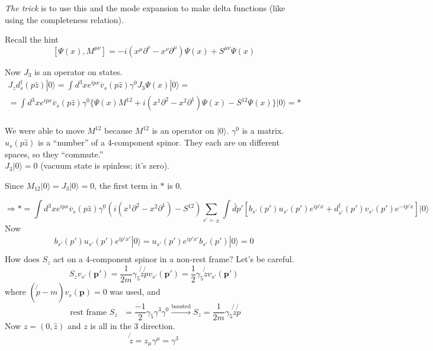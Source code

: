 \documentclass[twoside]{amsart}
\begin{document}
\emph{The trick} is to use this and the mode expansion to make delta functions (like using the completeness relation).  

Recall the hint 
\[
[ \Psi(x), M^{\mu \nu} ] = -i (x^{\mu} \partial^{\nu} - x^{\nu} \partial^{\mu})\Psi(x) + S^{\mu \nu} \Psi(x)
\]

Now $J_3$ is an operator on states.  
\[
\begin{gathered}
  J_z d_s^{\dag}(p\hat{z})|0\rangle = \int d^3x e^{ipx} \overline{v}_s(p\hat{z}) \gamma^0 J_3 \Psi(x)| 0\rangle = \\
  = \int d^3x e^{ipx} \overline{v}_s(p\hat{z})\gamma^0 \lbrace \Psi(x) M^{12} + i (x^1 \partial^2 - x^2 \partial^1) \Psi(x) - S^{12} \Psi(x) \rbrace |0 \rangle = * \\
\end{gathered}
\]

We were able to move $M^{12}$ because $M^{12}$ is an operator on $|0\rangle$.  $\gamma^0$ is a matrix.  $u_s(p\hat{z})$ is a ``number'' of a 4-component spinor.  They each are on different spaces, so they ``commute.'' \\

$J_3 |0 \rangle =0$ (vacuum state is spinless; it's zero).  

Since $M_{12}|0\rangle = J_3 |0 \rangle =0$, the first term in $*$ is 0.  

\[
\Longrightarrow * = \int d^3 x e^{ipx} \overline{v}_s(p\hat{z}) \gamma^0 \left( i (x^1 \partial^2 - x^2 \partial^1 ) - S^{12} \right) \sum_{s'=\pm} \int \widetilde{dp}'[ b_{s'}(p') u_{s'}(p')e^{ip'x} + d_{s'}^{\dag}(p') v_{s'}(p') e^{-ip'x} ]|0 \rangle
\]
Now
\[
\begin{gathered}
  b_{s'}(p')u_{s'}(p') e^{ip'x'}|0\rangle = u_{s'}(p')e^{ip'x'} b_{s'}(p')|0\rangle = 0  \\ 
\end{gathered}
\]
How does $S_z$ act on a 4-component spinor in a non-rest frame?  Let's be careful.  
\[
S_z v_{s'}(\mathbf{p'}) = \frac{1}{2m} \gamma_5\not{z}\not{p} v_{s'}(\mathbf{p}') = \frac{1}{2} \gamma_5 \not{z} v_{s'}(\mathbf{p'})
\]
where $(\not{p} - m) v_s(\mathbf{p}) = 0$ was used, and 
\[
\text{ rest frame $S_z$ } = \frac{-1}{2} \gamma_5 \gamma^3 \gamma^0 \xrightarrow{\text{boosted}} S_z = \frac{1}{2m} \gamma_5 \not{z}\not{p}
\]
Now $z = (0, \hat{z})$ and $z$ is all in the 3 direction.  
\[
\not{z} = z_{\mu}\gamma^{\mu} = \gamma^3
\]
\end{document}

